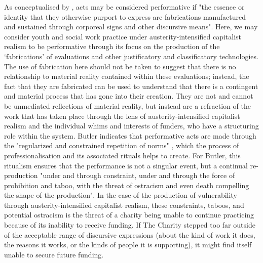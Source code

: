 As conceptualised by \citet[p. 173]{butler_gender_2011}, acts may be considered performative if "the essence or identity that they otherwise purport to express are fabrications manufactured and sustained through corporeal signs and other discursive means". Here, we may consider youth and social work practice under austerity-intensified capitalist realism to be performative through its focus on the production of the `fabrications' of evaluations and other justificatory and classificatory technologies. The use of fabrication here should not be taken to suggest that there is no relationship to material reality contained within these evaluations; instead, the fact that they are fabricated can be used to understand that there is a contingent and material process that has gone into their creation. They are not and cannot be unmediated reflections of material reality, but instead are a refraction of the work that has taken place through the lens of austerity-intensified capitalist realism and the individual whims and interests of funders, who have a structuring role within the system. Butler indicates that performative acts are made through the "regularized and constrained repetition of norms" \citep[p. 95]{butler_bodies_2014}, which the process of professionalisation and its associated rituals helps to create. For Butler, this ritualism ensures that the performance is not a singular event, but a continual re-production "under and through constraint, under and through the force of prohibition and taboo, with the threat of ostracism and even death compelling the shape of the production". In the case of the production of vulnerability through austerity-intensified capitalist realism, these constraints, taboos, and potential ostracism is the threat of a charity being unable to continue practicing because of its inability to receive funding. If The Charity stepped too far outside of the acceptable range of discursive expressions (about the kind of work it does, the reasons it works, or the kinds of people it is supporting), it might find itself unable to secure future funding. 

